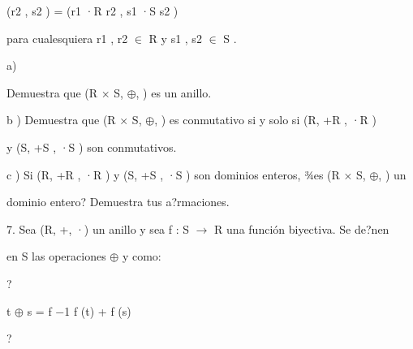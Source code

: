 \documentclass[a4paper,portrait,12pt]{article}
\begin{document}
\begin{flushleft}
(r2 , s2 ) = (r1 ·R r2 , s1 ·S s2 )
\end{flushleft}





\begin{flushleft}
para cualesquiera r1 , r2 $\in$ R y s1 , s2 $\in$ S .
\end{flushleft}


\begin{flushleft}
a)
\end{flushleft}





\begin{flushleft}
Demuestra que (R × S, $\oplus$, ) es un anillo.
\end{flushleft}


\begin{flushleft}
b ) Demuestra que (R × S, $\oplus$, ) es conmutativo si y solo si (R, +R , ·R )
\end{flushleft}


\begin{flushleft}
y (S, +S , ·S ) son conmutativos.
\end{flushleft}


\begin{flushleft}
c ) Si (R, +R , ·R ) y (S, +S , ·S ) son dominios enteros, ¾es (R × S, $\oplus$, ) un
\end{flushleft}


\begin{flushleft}
dominio entero? Demuestra tus a?rmaciones.
\end{flushleft}





\begin{flushleft}
7. Sea (R, +, ·) un anillo y sea f : S $\rightarrow$ R una funci\'{o}n biyectiva. Se de?nen
\end{flushleft}


\begin{flushleft}
en S las operaciones $\oplus$ y como:
\end{flushleft}


?


\begin{flushleft}
t $\oplus$ s = f $-$1 f (t) + f (s)
\end{flushleft}


?
\end{document}
